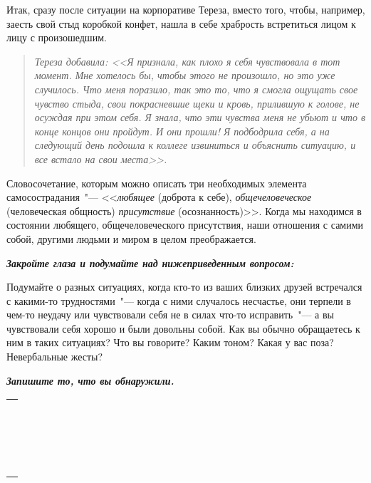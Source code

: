 Итак, сразу после ситуации на корпоративе Тереза, вместо того, чтобы, например, заесть свой стыд коробкой конфет, нашла в себе храбрость встретиться лицом к лицу с произошедшим.

\begin{quote} 
\textit{Тереза добавила: <<Я признала, как плохо я себя чувствовала в тот момент. Мне хотелось бы,  чтобы этого не произошло, но это уже случилось. Что меня поразило, так это то, что я смогла ощущать свое чувство стыда, свои покрасневшие щеки и кровь, прилившую к голове, не осуждая при этом себя. Я знала, что эти чувства меня не убьют и что в конце концов они пройдут. И они прошли! Я подбодрила себя, а на следующий день подошла к коллеге извиниться и объяснить ситуацию, и все встало на свои места>>.}
\end{quote}

Словосочетание, которым можно описать три необходимых элемента самосострадания~"--- <<\emph{любящее} (доброта к себе), \emph{общечеловеческое} (человеческая общность) \emph{присутствие} (осознанность)>>. Когда мы находимся в состоянии любящего, общечеловеческого присутствия, наши отношения с самими собой, другими людьми и миром в целом преображается.

\newpage
{}
\begin{itemize}
	\itemWritingHand \textbf{\textit{Закройте глаза и подумайте над нижеприведенным вопросом: }}
	
	Подумайте о разных ситуациях, когда кто-то из ваших близких друзей встречался с какими-то трудностями~"--- когда с ними случалось несчастье, они терпели в чем-то неудачу или чувствовали себя не в силах что-то исправить~"--- а вы чувствовали себя хорошо и были довольны собой. Как вы обычно обращаетесь к ним в таких ситуациях? 
	Что вы говорите? Каким тоном? Какая у вас поза? Невербальные жесты?
	
	\textbf{\textit{Запишите то, что вы обнаружили.}}
\end{itemize}

\setlength{\extrarowheight}{2mm}
\begin{tabularx}{\textwidth}{X}
	\\
	\arrayrulecolor{gray}\hline\\
	\hline\\
	\hline\\
	\hline\\
	\hline\\
	\hline\\
	\hline\\	
	\hline\\
	\hline\\
	\hline\\
	\hline\\
	\hline\\	
	\hline\\
	\hline\\
	\hline\\
	\hline\\	
	\hline\\
	\hline\\	
	\hline\\
\end{tabularx}
\setlength{\extrarowheight}{0mm}

